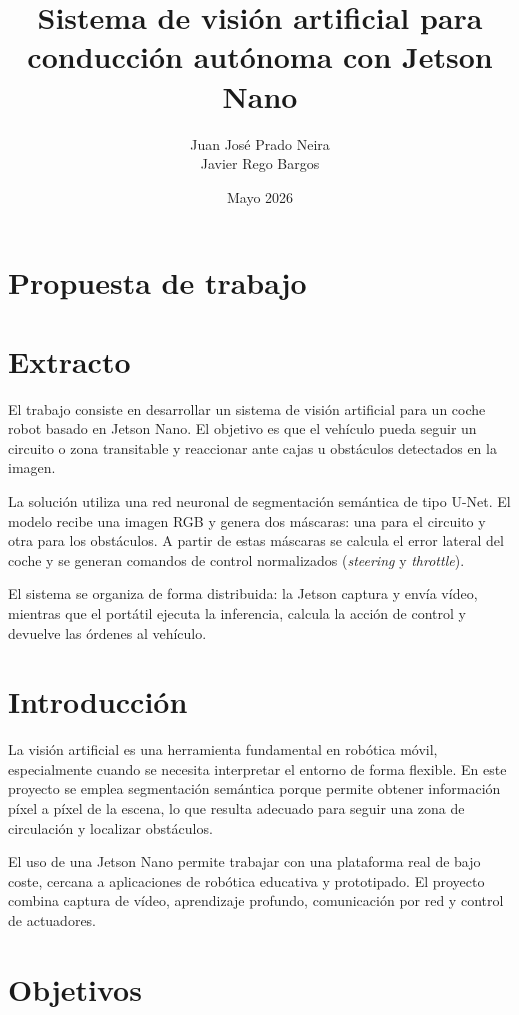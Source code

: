 \documentclass{article}
\title{Sistema de visi\'on artificial para conducci\'on aut\'onoma con Jetson Nano}
\author{Juan Jos\'e Prado Neira \\ Javier Rego Bargos}
\date{Mayo 2026}
\begin{document}
\maketitle

\section*{Propuesta de trabajo}

\section{Extracto}

El trabajo consiste en desarrollar un sistema de visi\'on artificial para un coche robot basado en Jetson Nano. El objetivo es que el veh\'iculo pueda seguir un circuito o zona transitable y reaccionar ante cajas u obst\'aculos detectados en la imagen.

La soluci\'on utiliza una red neuronal de segmentaci\'on sem\'antica de tipo U-Net. El modelo recibe una imagen RGB y genera dos m\'ascaras: una para el circuito y otra para los obst\'aculos. A partir de estas m\'ascaras se calcula el error lateral del coche y se generan comandos de control normalizados (\textit{steering} y \textit{throttle}).

El sistema se organiza de forma distribuida: la Jetson captura y env\'ia v\'ideo, mientras que el port\'atil ejecuta la inferencia, calcula la acci\'on de control y devuelve las \'ordenes al veh\'iculo.

\section{Introducci\'on}

La visi\'on artificial es una herramienta fundamental en rob\'otica m\'ovil, especialmente cuando se necesita interpretar el entorno de forma flexible. En este proyecto se emplea segmentaci\'on sem\'antica porque permite obtener informaci\'on p\'ixel a p\'ixel de la escena, lo que resulta adecuado para seguir una zona de circulaci\'on y localizar obst\'aculos.

El uso de una Jetson Nano permite trabajar con una plataforma real de bajo coste, cercana a aplicaciones de rob\'otica educativa y prototipado. El proyecto combina captura de v\'ideo, aprendizaje profundo, comunicaci\'on por red y control de actuadores.

\section{Objetivos}
\end{document}
